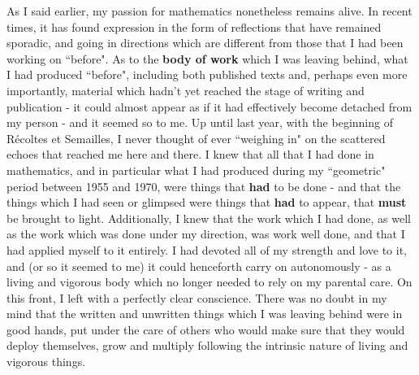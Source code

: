As I said earlier, my passion for mathematics nonetheless remains alive. In recent times, it has found expression in the form of reflections that have remained sporadic, and going in directions which are different from those that I had been working on ``before". As to the \textbf{body of work} which I was leaving behind, what I had produced ``before", including both published texts and, perhaps even more importantly, material which hadn't yet reached the stage of writing and publication - it could almost appear as if it had effectively become detached from my person - and it seemed so to me. Up until last year, with the beginning of R\'ecoltes et Semailles, I never thought of ever ``weighing in" on the scattered echoes that reached me here and there.
I knew that all that I had done in mathematics, and in particular what I had produced during my ``geometric" period between 1955 and 1970, were things that \textbf{had} to be done - and that the things which I had seen or glimpsed were things that \textbf{had} to appear, that \textbf{must} be brought to light. Additionally, I knew that the work which I had done, as well as the work which was done under my direction, was work well done, and that I had applied myself to it entirely. I had devoted all of my strength and love to it, and (or so it seemed to me) it could henceforth carry on autonomously - as a living and vigorous body which no longer needed to rely on my parental care. On this front, I left with a perfectly clear conscience. There was no doubt in my mind that the written and unwritten things which I was leaving behind were in good hands, put under the care of others who would make sure that they would deploy themselves, grow and multiply following the intrinsic nature of living and vigorous things.

